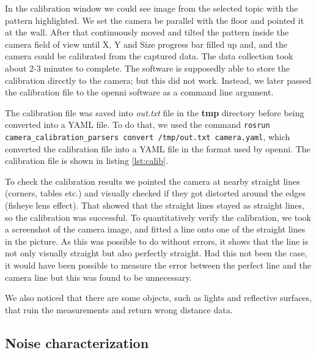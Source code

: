 \documentclass[11pt]{article}
\begin{document}
In the calibration window we could see image from the selected topic with the
pattern highlighted. We set the camera be parallel with the floor and pointed it
at the wall. After that continuously moved and tilted the pattern inside the
camera field of view until X, Y and Size progress bar filled up and, and the
camera could be calibrated from the captured data. The data collection took
about 2-3 minutes to complete.  The software is supposedly able to store the
calibration directly to the camera; but this did not work. Instead, we later passed the calibration file
to the openni software as a command line argument. \par
        
The calibration file was saved into \emph{out.txt} file in the \textbf{tmp}
directory before being converted into a YAML file. To do that, we used
the command \texttt{rosrun camera\_calibration\_parsers convert /tmp/out.txt camera.yaml},
which converted the calibration file into a YAML file in the format used by openni. The calibration file is shown in listing \vref{lst:calib}. \par
        
To check the calibration results we pointed the camera at nearby straight lines
(corners, tables etc.) and visually checked if they got distorted around the
edges (fisheye lens effect). That showed that the straight lines stayed as
straight lines, so the calibration was successful. To quantitatively verify the
calibration, we took a screenshot of the camera image, and fitted a line onto
one of the straight lines in the picture. As this was possible to do without errors, it shows
that the line is not only visually straight but also perfectly straight. Had
this not been the case, it would have been possible to measure the error
between the perfect line and the camera line but this was found to be
unnecessary. \par

We also noticed that there are some objects, such as lights and reflective 
surfaces, that ruin the measurements and return wrong distance 
data. \par
	


\subsection{Noise characterization}
\end{document}
